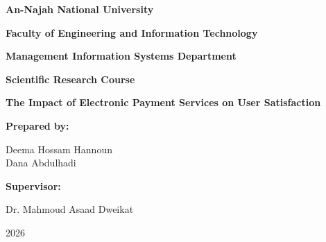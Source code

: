\documentclass[12pt,a4paper]{article}
\begin{document}
\begin{titlepage}
\centering

\vspace*{1cm}

{\Large \textbf{An-Najah National University}\par}

\vspace{0.4cm}

{\large \textbf{Faculty of Engineering and Information Technology}\par}

\vspace{0.3cm}

{\large \textbf{Management Information Systems Department}\par}

\vspace{1.2cm}

{\large \textbf{Scientific Research Course}\par}

\vspace{1.8cm}

{\LARGE \textbf{The Impact of Electronic Payment Services on User Satisfaction}\par}

\vspace{2cm}

{\large \textbf{Prepared by:}\par}

\vspace{0.5cm}

{\large
Deema Hossam Hannoun\\
Dana Abdulhadi
\par}

\vspace{1.5cm}

{\large \textbf{Supervisor:}\par}

\vspace{0.5cm}

{\large Dr. Mahmoud Asaad Dweikat\par}

\vfill

{\large 2026\par}

\end{titlepage}
\end{document}
